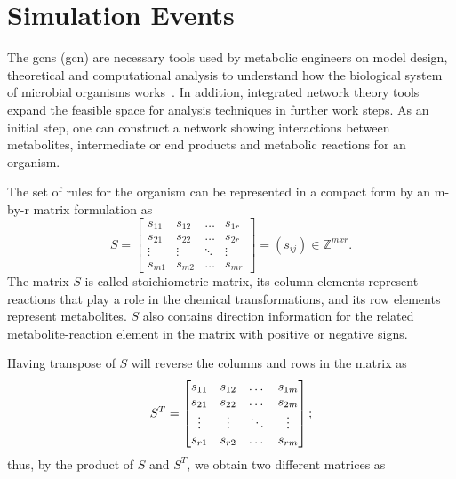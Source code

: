\section{Simulation Events}\label{section: simulation_model}
The \acl{gcn}s (\acs{gcn}) are necessary tools used by metabolic engineers on model design, theoretical and computational analysis to understand how the biological system of microbial organisms works~\cite{HAO}. In addition, integrated network theory tools expand the feasible space for analysis techniques in further work steps. As an initial step, one can construct a network showing interactions between metabolites, intermediate or end products and metabolic reactions for an organism. 

The set of rules for the organism can be represented in a compact form by an m-by-r matrix formulation as
\begin{equation} %
	S =  \begin{bmatrix} 
		s_{11} & s_{12} & \dots  & s_{1r}\\
		s_{21} & s_{22} & \dots  & s_{2r}\\
		\vdots & \vdots &\ddots & \vdots \\
		s_{m1} & s_{m2} & \dots & s_{mr} 
	\end{bmatrix}=(s_{ij})\in \mathbb{Z}^{mxr}.
	\label{stoichio}
\end{equation}
The matrix $S$ is called stoichiometric matrix, its column elements represent reactions that play a role in the chemical transformations, and its row elements represent metabolites. $S$ also contains direction information for the related metabolite-reaction element in the matrix with positive or negative signs.~\cite{klipp2005systems} 

Having transpose of $S$ will reverse the columns and rows in the matrix as 
\begin{equation}
	S^{T} =  \begin{bmatrix} 
		s_{11} & s_{12} & \dots  & s_{1m}\\
		s_{21} & s_{22} & \dots  & s_{2m}\\
		\vdots & \vdots &\ddots & \vdots \\
		s_{r1} & s_{r2} & \dots & s_{rm} 
	\end{bmatrix};
	\notag
\end{equation}
thus, by the product of $S$ and $S^{T}$, we obtain two different matrices as


